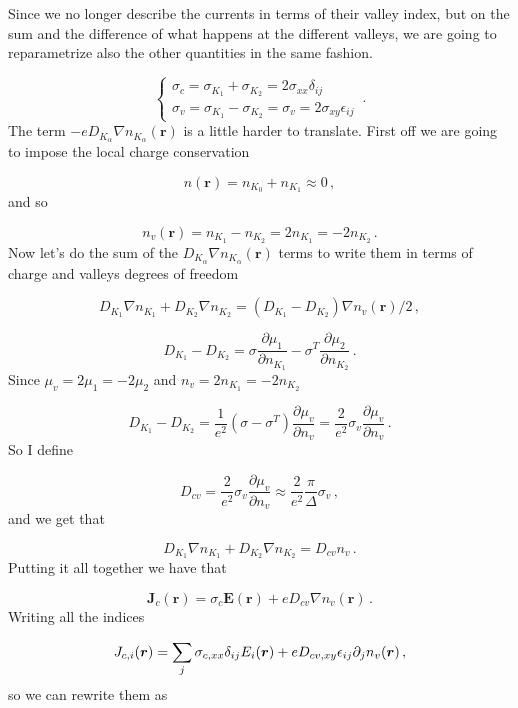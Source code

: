 Since we no longer describe the currents in terms of their valley index, but on the sum and the difference of what happens at the different valleys, we are going to reparametrize also the other quantities in the same fashion.


\begin{equation}
    \begin{cases}
        \sigma_c=\sigma_{K_1}+\sigma_{K_2}=2\sigma_{xx}\delta_{ij}\\
        \sigma_v=\sigma_{K_1}-\sigma_{K_2}=\sigma_v=2\sigma_{xy}\epsilon_{ij}
    \end{cases}\,.
\end{equation}
The term $-eD_{K_\alpha}\nabla n_{K_\alpha}(\mathbf r)$ is a little harder to translate. First off we are going to impose the local charge conservation

\[
    n(\mathbf r)=n_{K_0}+n_{K_1}\approx 0\,,
\]
and so 

\begin{equation}
    n_v(\mathbf r)=n_{K_1}-n_{K_2}=2n_{K_1}=-2n_{K_2}\,.
\end{equation}
Now let's do the sum of the $D_{K_\alpha}\nabla n_{K_\alpha}(\mathbf r)$ terms to write them in terms of charge and valleys degrees of freedom

\[
    D_{K_1}\nabla n_{K_1}+D_{K_2}\nabla n_{K_2}=(D_{K_1}-D_{K_2})\nabla n_v(\mathbf r)/2\,,
\]

\[D_{K_1}-D_{K_2}=\sigma \frac{\partial \mu_1}{\partial n_{K_1}}- \sigma^T \frac{\partial \mu_2}{\partial n_{K_2}}\,.\]
Since $\mu_v=2\mu_1=-2\mu_2$ and $n_v=2n_{K_1}=-2n_{K_2}$

\[D_{K_1}-D_{K_2}=\frac 1{e^2}(\sigma-\sigma^T)\frac{\partial \mu_v}{\partial n_v}=\frac 2{e^2}\sigma_v\frac{\partial \mu_v}{\partial n_v}\,.\]
So I define 

\[D_{cv}=\frac 2{e^2}\sigma_v\frac{\partial \mu_v}{\partial n_v}\approx\frac 2{e^2} \frac \pi\Delta\sigma_v\,,\]
and we get that

\[D_{K_1}\nabla n_{K_1}+D_{K_2}\nabla n_{K_2}=D_{cv}n_v\,.\]
Putting it all together we have that

\[\mathbf J_c(\mathbf r)=\sigma_c \mathbf E(\mathbf r)+eD_{cv}\nabla n_v(\mathbf r)\,.\]
Writing all the indices

\begin{equation}
    J_{c,i}(\boldsymbol{r})=\sum_j \sigma_{c,xx}\delta_{ij}E_i(\boldsymbol{r})+eD_{cv,xy}\epsilon_{ij}\partial_j n_v(\boldsymbol{r})\,,
\end{equation}
so we can rewrite them as


